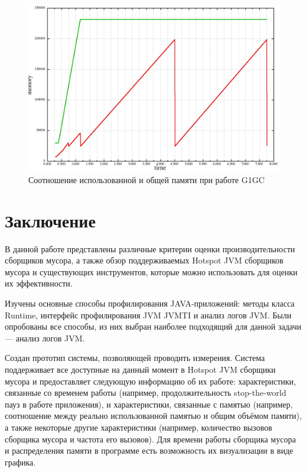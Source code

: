 \documentclass[12pt,a4paper]{article}
\begin{document}
\begin{figure}
\centering
\caption{\label{pic:g1mem}Соотношение использованной и общей памяти при работе G1GC}
\includegraphics[width=1\linewidth]{g1mem.jpg}
\end{figure}

\newpage
\section*{Заключение}

В данной работе представлены различные критерии оценки производительности сборщиков мусора,
а также обзор поддерживаемых Hotspot JVM сборщиков мусора и существующих инструментов,
которые можно использовать для оценки их эффективности.

Изучены основные способы профилирования JAVA-приложений: методы класса Runtime, интерфейс
профилирования JVM JVMTI и анализ логов JVM. Были опробованы все способы,
из них выбран наиболее подходящий для данной задачи --- анализ логов JVM.

Создан прототип системы, позволяющей проводить измерения. Система поддерживает все доступные на данный
момент в Hotspot JVM сборщики мусора и предоставляет следующую информацию об их работе: характеристики, связанные
со временем работы (например, продолжительность stop-the-world пауз в работе приложения), и
характеристики, связанные с памятью (например, соотношение между реально использованной 
памятью и общим объёмом памяти), а также некоторые другие характеристики (например,
количество вызовов сборщика мусора и частота его вызовов). Для времени работы сборщика 
мусора и распределения памяти в программе есть возможность их визуализации в виде
графика.
\newpage
\nocite{gcpage}
\nocite{jvmmem}
\nocite{book:g1}


\end{document}
